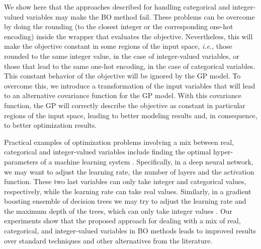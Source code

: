 We show here that the approaches described for handling categorical and integer-valued variables may
make the BO method fail. These problems can be overcome by doing the rounding (to the closest integer or
the corresponding one-hot encoding) inside the wrapper that evaluates the objective.
Nevertheless, this will make the objective constant in some regions of the input space, \emph{i.e.}, those
rounded to the same integer value, in the case of integer-valued variables, or those that lead to the same
one-hot encoding, in the case of categorical variables. This constant behavior of the objective will be
ignored by the GP model. To overcome this, we introduce a transformation of the input
variables that will lead to an alternative covariance function for the GP model.
With this covariance function, the GP will correctly describe the objective as constant
in particular regions of the input space, leading to better modeling results and,
in consequence, to better optimization results.

Practical examples of optimization problems involving a mix between real, categorical and integer-valued
variables include finding the optimal hyper-parameters of a machine learning system \citep{snoek2012practical}.
Specifically, in a deep neural network, we may want to adjust the learning
rate, the number of layers and the activation function. These two last variables can only take integer
and categorical values, respectively, while the learning rate can take real values.
Similarly, in a gradient boosting ensemble of decision trees we may try to
adjust the learning rate and the maximum depth of the trees, which can only take integer values \citep{friedman2001greedy}.
Our experiments show that the proposed approach for dealing with a mix of real, categorical, and
integer-valued variables in BO methods leads to improved results over standard techniques
and other alternatives from the literature.

